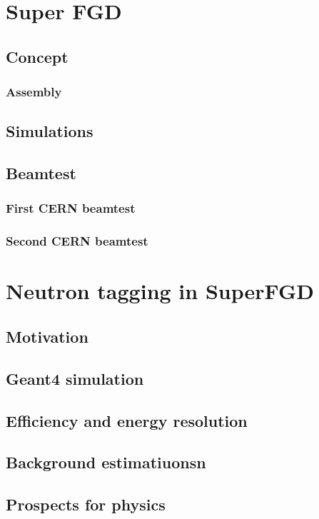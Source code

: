 \documentclass[../main.tex]{subfiles}
\begin{document}
\chapter{Super FGD}
\section{Concept}
\subsection{Assembly}
\section{Simulations}
\section{Beamtest}
\subsection{First CERN beamtest}
\subsection{Second CERN beamtest}

\chapter{Neutron tagging in SuperFGD}
\section{Motivation}
\section{Geant4 simulation}
\section{Efficiency and energy resolution} 
\section{Background estimatiuonsn}
\section{Prospects for physics}
\end{document}
